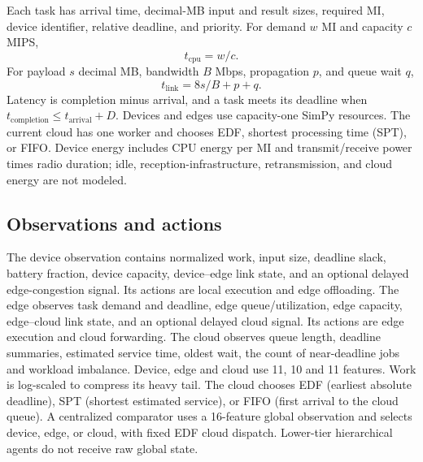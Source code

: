 Each task has arrival time, decimal-MB input and result sizes, required MI,
device identifier, relative deadline, and priority. For demand $w$ MI and
capacity $c$ MIPS,
\begin{equation}
t_{\mathrm{cpu}} = w/c.
\end{equation}
For payload $s$ decimal MB, bandwidth $B$ Mbps, propagation $p$, and queue
wait $q$,
\begin{equation}
t_{\mathrm{link}} = 8s/B+p+q.
\end{equation}
Latency is completion minus arrival, and a task meets its deadline when
$t_{\mathrm{completion}}\leq t_{\mathrm{arrival}}+D$. Devices and edges use
capacity-one SimPy resources. The current cloud has one worker and chooses
EDF, shortest processing time (SPT), or FIFO. Device energy includes CPU
energy per MI and transmit/receive power times radio duration; idle,
reception-infrastructure, retransmission, and cloud energy are not modeled.

\subsection{Observations and actions}
The device observation contains normalized work, input size, deadline slack,
battery fraction, device capacity, device--edge link state, and an optional
delayed edge-congestion signal. Its actions are local execution and edge
offloading. The edge observes task demand and deadline, edge queue/utilization,
edge capacity, edge--cloud link state, and an optional delayed cloud signal.
Its actions are edge execution and cloud forwarding. The cloud observes queue
length, deadline summaries, estimated service time, oldest wait, the count
of near-deadline jobs and workload imbalance. Device, edge and cloud use
11, 10 and 11 features. Work is log-scaled to compress its heavy tail.
The cloud chooses EDF (earliest absolute deadline), SPT (shortest
estimated service), or FIFO (first arrival to the cloud queue).
A centralized comparator uses a 16-feature
global observation and selects device, edge, or cloud, with fixed EDF cloud
dispatch. Lower-tier hierarchical agents do not receive raw global state.

